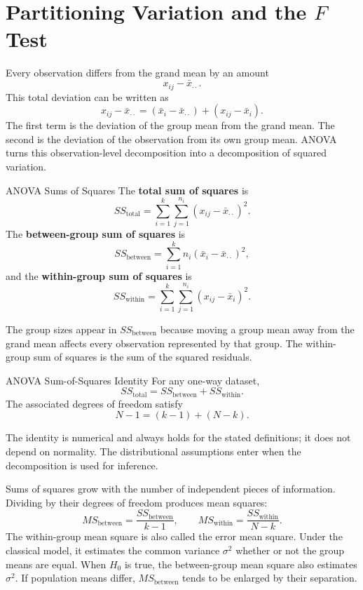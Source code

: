 \newpage

\section{Partitioning Variation and the \texorpdfstring{$F$}{F} Test}
\label{sec:anova-partition-f-test}

Every observation differs from the grand mean by an amount
\[
x_{ij}-\bar x_{\cdot\cdot}.
\]
This total deviation can be written as
\[
x_{ij}-\bar x_{\cdot\cdot}
=
(\bar x_i-\bar x_{\cdot\cdot})
+
(x_{ij}-\bar x_i).
\]
The first term is the deviation of the group mean from the grand mean. The second is the deviation of the observation from its own group mean. ANOVA turns this observation-level decomposition into a decomposition of squared variation.

\begin{definition}{ANOVA Sums of Squares}
The \textbf{total sum of squares} is
\[
SS_{\text{total}}
=\sum_{i=1}^{k}\sum_{j=1}^{n_i}
(x_{ij}-\bar x_{\cdot\cdot})^2.
\]
The \textbf{between-group sum of squares} is
\[
SS_{\text{between}}
=\sum_{i=1}^{k}n_i
(\bar x_i-\bar x_{\cdot\cdot})^2,
\]
and the \textbf{within-group sum of squares} is
\[
SS_{\text{within}}
=\sum_{i=1}^{k}\sum_{j=1}^{n_i}
(x_{ij}-\bar x_i)^2.
\]
\end{definition}

The group sizes appear in $SS_{\text{between}}$ because moving a group mean away from the grand mean affects every observation represented by that group. The within-group sum of squares is the sum of the squared residuals.

\begin{theorem}{ANOVA Sum-of-Squares Identity}
For any one-way dataset,
\[
SS_{\text{total}}
=SS_{\text{between}}+SS_{\text{within}}.
\]
The associated degrees of freedom satisfy
\[
N-1=(k-1)+(N-k).
\]
\end{theorem}

The identity is numerical and always holds for the stated definitions; it does not depend on normality. The distributional assumptions enter when the decomposition is used for inference.

Sums of squares grow with the number of independent pieces of information. Dividing by their degrees of freedom produces mean squares:
\[
MS_{\text{between}}
=\frac{SS_{\text{between}}}{k-1},
\qquad
MS_{\text{within}}
=\frac{SS_{\text{within}}}{N-k}.
\]
The within-group mean square is also called the error mean square. Under the classical model, it estimates the common variance $\sigma^2$ whether or not the group means are equal. When $H_0$ is true, the between-group mean square also estimates $\sigma^2$. If population means differ, $MS_{\text{between}}$ tends to be enlarged by their separation.

